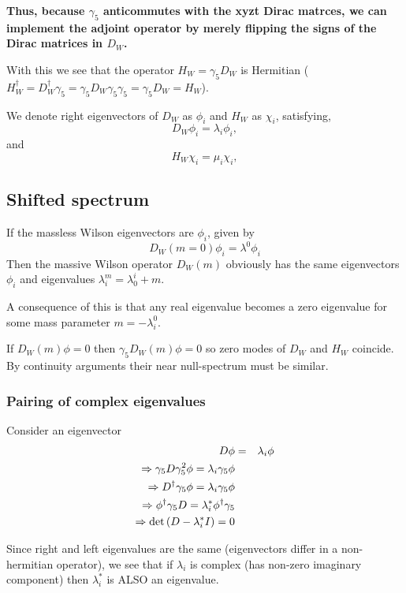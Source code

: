 \documentclass[letter,10pt]{report}
\begin{document}
{\bf Thus, because $\gamma_5$ anticommutes with the xyzt Dirac matrces, 
we can implement the adjoint operator by merely flipping the signs of the Dirac matrices in $D_W$.}

With this we see that the operator
$
H_W = \gamma_5 D_W 
$
is Hermitian 
($
H_W^\dagger =  D_W^\dagger \gamma_5 =  \gamma_5 D_W\gamma_5\gamma_5 =  \gamma_5 D_W = H_W
$).


We denote right eigenvectors of $D_W$ as $\phi_i$ and $H_W$ as $\chi_i$,
satisfying,
$$
D_W \phi_i = \lambda_i \phi_i,
$$
and
$$
H_W \chi_i = \mu_i \chi_i,
$$

\subsection{Shifted spectrum}

If the massless Wilson eigenvectors are $\phi_i$, given by
$$
D_W(m=0) \phi_i = \lambda^0 \phi_i
$$
Then the massive Wilson operator $D_W(m)$ obviously has the same eigenvectors $\phi_i$ and eigenvalues $\lambda^m_i = \lambda_0^i+m$.

A consequence of this is that any real eigenvalue becomes a zero eigenvalue for some mass parameter $m=-\lambda_i^0$.

If $D_W(m) \phi = 0$ then $\gamma_5 D_W(m) \phi = 0$ so zero modes of $D_W$ and $H_W$ coincide. By continuity arguments their near null-spectrum
must be similar.

\subsubsection{Pairing of complex eigenvalues}

Consider an eigenvector
\begin{eqnarray}
  D \phi &=& \lambda_i \phi \\
\Rightarrow  \gamma_5 D \gamma_5^2 \phi= \lambda_i \gamma_5 \phi\\
\Rightarrow   D^\dagger \gamma_5 \phi= \lambda_i \gamma_5 \phi\\
\Rightarrow   \phi^\dagger \gamma_5 D = \lambda_i^\ast  \phi^\dagger \gamma_5\\
\Rightarrow   {\rm det} \left( D - \lambda_i^\ast I \right) = 0
\end{eqnarray}

Since right and left eigenvalues are the same (eigenvectors differ in a non-hermitian operator), we see
that if $\lambda_i$ is complex (has non-zero imaginary component) then $\lambda_i^\ast$ is ALSO an eigenvalue.
\end{document}
